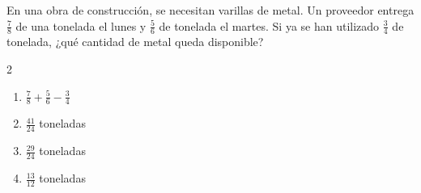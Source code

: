 En una obra de construcción, se necesitan varillas de metal. Un proveedor entrega $\frac{7}{8}$ de una tonelada el lunes y $\frac{5}{6}$ de tonelada el martes. Si ya se han utilizado $\frac{3}{4}$ de tonelada, ¿qué cantidad de metal queda disponible?
\begin{multicols}{2}
\begin{enumerate}[label=\alph*)]
\item $\frac{7}{8} + \frac{5}{6} - \frac{3}{4}$
\item $\frac{41}{24}$ toneladas
\item $\frac{29}{24}$ toneladas
\item $\frac{13}{12}$ toneladas
\end{enumerate}
\end{multicols}